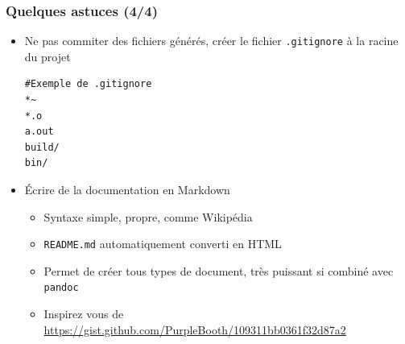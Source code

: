 \documentclass[table,tikz,12pt,svgnames]{beamer}
\begin{document}
\begin{frame}[fragile]
\begin{block}{}
\begin{itemize}
\end{itemize}
\end{block}
\end{frame}


\begin{frame}[fragile]
\frametitle{Quelques astuces (4/4)}
\vspace{-1em}
\begin{block}{}
\begin{itemize}
\item Ne pas commiter des fichiers générés, créer le fichier \texttt{.gitignore} à la racine du projet
\begin{adjustwidth}{0em}{0cm}
\begin{verbatim}
#Exemple de .gitignore
*~
*.o
a.out
build/
bin/
\end{verbatim}
\end{adjustwidth}
\item Écrire de la documentation en Markdown
\begin{itemize}
\item Syntaxe simple, propre, comme Wikipédia
\item \texttt{README.md} automatiquement converti en HTML
\item Permet de créer tous types de document, très puissant si combiné avec \texttt{pandoc}
\item Inspirez vous de \url{https://gist.github.com/PurpleBooth/109311bb0361f32d87a2}
\end{itemize}
\end{itemize}
\end{block}
\end{frame}
\end{document}
